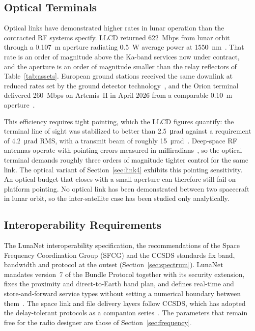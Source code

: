 \documentclass{IEEEoj}
\begin{document}
\subsection{Optical Terminals}
Optical links have demonstrated higher rates in lunar operation than the contracted RF systems specify. LLCD returned \SI{622}{Mbps} from lunar orbit through a \SI{0.107}{m} aperture radiating \SI{0.5}{W} average power at \SI{1550}{nm}~\cite{boroson_llcd}. That rate is an order of magnitude above the Ka-band services now under contract, and the aperture is an order of magnitude smaller than the relay reflectors of Table~\ref{tab:assets}. European ground stations received the same downlink at reduced rates set by the ground detector technology~\cite{giggenbach_locl}, and the Orion terminal delivered \SI{260}{Mbps} on Artemis~II in April 2026 from a comparable \SI{0.10}{m} aperture~\cite{nasa_o2o,nasa_o2o2026}.

This efficiency requires tight pointing, which the LLCD figures quantify: the terminal line of sight was stabilized to better than \SI{2.5}{\micro\radian} against a requirement of \SI{4.2}{\micro\radian} RMS, with a transmit beam of roughly \SI{15}{\micro\radian}~\cite{boroson_llcd}. Deep-space RF antennas operate with pointing errors measured in milliradians~\cite{dsn_810_005}, so the optical terminal demands roughly three orders of magnitude tighter control for the same link. The optical variant of Section~\ref{sec:link4} exhibits this pointing sensitivity. An optical budget that closes with a small aperture can therefore still fail on platform pointing. No optical link has been demonstrated between two spacecraft in lunar orbit, so the inter-satellite case has been studied only analytically.

\subsection{Interoperability Requirements}
The LunaNet interoperability specification, the recommendations of the Space Frequency Coordination Group (SFCG) and the CCSDS standards fix band, bandwidth and protocol at the outset (Section~\ref{sec:spectrum}). LunaNet mandates version~7 of the Bundle Protocol together with its security extension, fixes the proximity and direct-to-Earth band plan, and defines real-time and store-and-forward service types without setting a numerical boundary between them~\cite{lnis_v5}. The space link and file delivery layers follow CCSDS, which has adopted the delay-tolerant protocols as a companion series~\cite{ccsds_bp,ccsds_ltp,ccsds_lunar_standards}. The parameters that remain free for the radio designer are those of Section~\ref{sec:frequency}.
\end{document}
